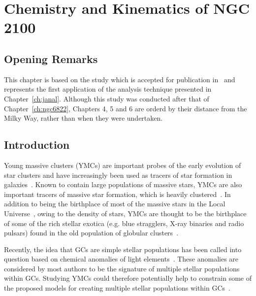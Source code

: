 \chapter{Chemistry and Kinematics of NGC\,2100}\label{ch:ngc2100}

\section{Opening Remarks} %
\label{sec:opening_remarks}

This chapter is based on the study which is accepted for publication in~\cite{2016arXiv160202702P} and represents the first application of the analysis technique presented in Chapter~\ref{ch:janal}.
Although this study was conducted after that of Chapter~\ref{ch:ngc6822}, Chapters 4, 5 and 6 are orderd by their distance from the Milky Way, rather than when they were undertaken.


\section{Introduction} %
\label{sec:ngc2100intro}

Young massive clusters (YMCs\footnotemark) are important probes of the early evolution of star clusters and have increasingly been used as tracers of star formation in galaxies~\citep[e.g.][]{1995AJ....109..960W,1997AJ....114.2381M,1999AJ....118..752Z}.
Known to contain large populations of massive stars, YMCs are also important tracers of massive star formation, which is heavily clustered~\citep{2003ARA&A..41...57L,2005A&A...437..247D,2007MNRAS.380.1271P}.
In addition to being the birthplace of most of the massive stars in the Local Universe~\citep[$>200\,$M$_{\odot}$ stars in R136;][]{2010MNRAS.408..731C}, owing to the density of stars, YMCs are thought to be the birthplace of some of the rich stellar exotica
(e.g. blue stragglers, X-ray binaries and radio pulsars) found in the old population of globular clusters~\citep[GCs;][]{2010ARA&A..48..431P}.


Recently, the idea that GCs are simple stellar populations has been called into question based on chemical anomalies of light elements~\citep[C, N, O, Na and Al; e.g.][]{2012A&ARv..20...50G}.
These anomalies are considered by most authors to be the signature of multiple stellar populations within GCs.
Studying YMCs could therefore potentially help to constrain some of the proposed models for creating multiple stellar populations within GCs~\citep[e.g.][]{2014MNRAS.441.2754C}.


